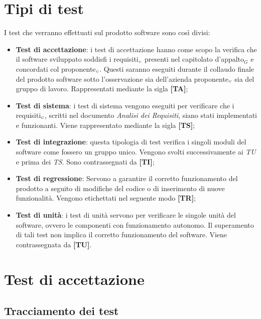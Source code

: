 \section{Tipi di test} \label{SpecificaDeiTestTipiDiTest}
I test che verranno effettuati sul prodotto software sono così divisi:
\begin{itemize}
	\item \textbf{Test di accettazione}: i test di accettazione hanno come scopo la verifica che il software sviluppato soddisfi i requisiti$_{\scaleto{G}{3pt}}$ presenti nel capitolato d’appalto$_G$ e concordati col proponente$_{\scaleto{G}{3pt}}$.
	Questi saranno eseguiti durante il collaudo finale del prodotto software sotto l'osservazione sia dell'azienda proponente$_{\scaleto{G}{3pt}}$ sia del gruppo di lavoro.
	Rappresentati mediante la sigla \textbf{[TA]};

	\item \textbf{Test di sistema}: i test di sistema vengono eseguiti per verificare che i requisiti$_{\scaleto{G}{3pt}}$, scritti nel documento \textit{Analisi dei Requisiti}, siano stati implementati e funzionanti.
	Viene rappresentato mediante la sigla \textbf{[TS]};

	\item \textbf{Test di integrazione}: questa tipologia di test verifica i singoli moduli del software come fossero un gruppo unico.
	Vengono svolti successivamente ai \textit{TU} e prima dei \textit{TS}.
	Sono contrassegnati da \textbf{[TI]};

	\item \textbf{Test di regressione}: Servono a garantire il corretto funzionamento del prodotto a seguito di modifiche del codice o di inserimento di nuove funzionalità.
	Vengono etichettati nel seguente modo \textbf{[TR]};

	\item \textbf{Test di unità}: i test di unità servono per verificare le singole unità del software, ovvero le componenti con funzionamento autonomo.
	Il superamento di tali test non implica il corretto funzionamento del software.
	Viene contrassegnata da \textbf{[TU]}.
\end{itemize}

\section{Test di accettazione}\label{SpecificaDeiTestTestDiAccettazione}
\subsection{Tracciamento dei test}\label{SpecificaDeiTestTestDiAccettazioneTracciamentoDeiTest}

